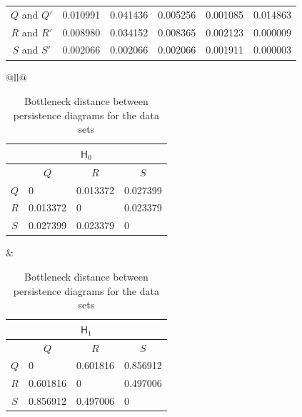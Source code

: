 \documentclass[sn-mathphys-num]{sn-jnl}%
\theoremstyle{thmstyleone}%
\theoremstyle{thmstyletwo}%
\theoremstyle{thmstylethree}%
\begin{document}
\begin{table}[h]
\begin{tabular}{@{}clllll@{}}
		$Q$ and $Q'$ & 0.010991                       & 0.041436                  & 0.005256                               & 0.001085                          & 0.014863                        \\
		$R$ and $R'$ & 0.008980                       & 0.034152                  & 0.008365                               & 0.002123                          & 0.000009                        \\
		$S$ and $S'$ & 0.002066                       & 0.002066                  & 0.002066                               & 0.001911                          & 0.000003                        \\ \bottomrule
	\end{tabular}
	\label{table: same shape}
\end{table}

\begin{table}[h]
	\centering
	\caption{Bottleneck distance between persistence diagrams for the data sets}
	\begin{tabular}{@{}ll@{}}
		\begin{tabular}{@{}clll@{}}
			\multicolumn{4}{c}{$\mathsf{H}_0$}                                                \\ \toprule
			& \multicolumn{1}{c}{$Q$} & \multicolumn{1}{c}{$R$} & \multicolumn{1}{c}{$S$} \\ \midrule
			$Q$ & 0                       & 0.013372                & 0.027399                \\
			$R$ & 0.013372                & 0                       & 0.023379                \\
			$S$ & 0.027399                & 0.023379                & 0                       \\ \bottomrule
		\end{tabular}	& 
		\begin{tabular}{@{}clll@{}}
			\multicolumn{4}{c}{$\mathsf{H}_1$}                                                \\ \toprule
			& \multicolumn{1}{c}{$Q$} & \multicolumn{1}{c}{$R$} & \multicolumn{1}{c}{$S$} \\ \midrule
			$Q$ & 0                       & 0.601816                & 0.856912                \\
			$R$ & 0.601816                & 0                       & 0.497006                \\
			$S$ & 0.856912                & 0.497006                & 0                       \\ \bottomrule
		\end{tabular}
	\end{tabular}
	\label{table: bottleneck distance}
\end{table}
\end{document}
